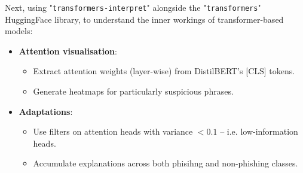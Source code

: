\noindent Next, using "\texttt{transformers-interpret}" alongside the "\texttt{transformers}" HuggingFace library, to understand the inner workings of transformer-based models:

\begin{itemize}
  \item \textbf{Attention visualisation}:
  \begin{itemize}
    \item Extract attention weights (layer-wise) from DistilBERT's [CLS] tokens.
    \item Generate heatmaps for particularly suspicious phrases.
  \end{itemize}
  \item \textbf{Adaptations}:
  \begin{itemize}
    \item Use filters on attention heads with variance $<0.1$ -- i.e. low-information heads.
    \item Accumulate explanations across both phisihng and non-phishing classes.
  \end{itemize}
\end{itemize}
